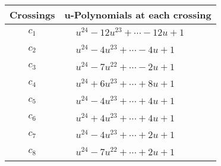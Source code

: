 \documentclass[1p]{elsarticle_modified}
\theoremstyle{definition}
\begin{document}
\begin{tabular}{m{50pt}|m{274pt}}
Crossings & \hspace{64pt}u-Polynomials at each crossing \\
\hline $$\begin{aligned}c_{1}\end{aligned}$$&$\begin{aligned}
&u^{24}-12 u^{23}+\cdots-12 u+1
\end{aligned}$\\
\hline $$\begin{aligned}c_{2}\end{aligned}$$&$\begin{aligned}
&u^{24}-4 u^{23}+\cdots-4 u+1
\end{aligned}$\\
\hline $$\begin{aligned}c_{3}\end{aligned}$$&$\begin{aligned}
&u^{24}-7 u^{22}+\cdots-2 u+1
\end{aligned}$\\
\hline $$\begin{aligned}c_{4}\end{aligned}$$&$\begin{aligned}
&u^{24}+6 u^{23}+\cdots+8 u+1
\end{aligned}$\\
\hline $$\begin{aligned}c_{5}\end{aligned}$$&$\begin{aligned}
&u^{24}-4 u^{23}+\cdots+4 u+1
\end{aligned}$\\
\hline $$\begin{aligned}c_{6}\end{aligned}$$&$\begin{aligned}
&u^{24}+4 u^{23}+\cdots+4 u+1
\end{aligned}$\\
\hline $$\begin{aligned}c_{7}\end{aligned}$$&$\begin{aligned}
&u^{24}-4 u^{23}+\cdots+2 u+1
\end{aligned}$\\
\hline $$\begin{aligned}c_{8}\end{aligned}$$&$\begin{aligned}
&u^{24}-7 u^{22}+\cdots+2 u+1
\end{aligned}$\\

\end{tabular}
\end{document}
